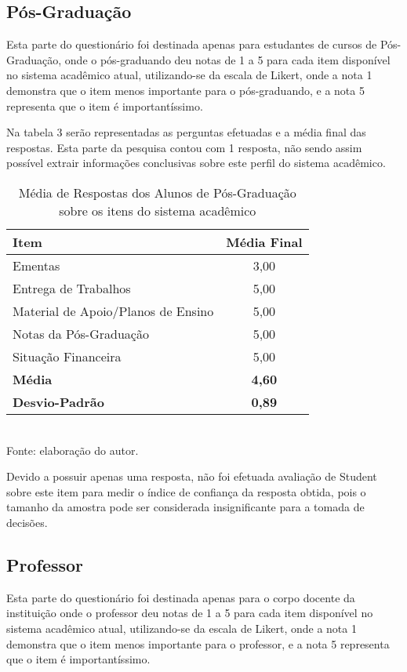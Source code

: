 \subsection{Pós-Graduação}
Esta parte do questionário foi destinada apenas para estudantes de cursos de Pós-Graduação, onde o pós-graduando deu notas de 1 a 5 para cada item disponível no sistema acadêmico atual, utilizando-se da escala de Likert, onde  a nota 1 demonstra que o item menos importante para o pós-graduando, e a nota 5 representa que o item é importantíssimo.

Na tabela 3 serão representadas as perguntas efetuadas e a média final das respostas. Esta parte da pesquisa contou com 1 resposta, não sendo assim possível extrair informações conclusivas sobre este perfil do sistema acadêmico.

\begin{table}[!hbt]
\centering
\caption[Média de Respostas dos Alunos de Pós-Graduação]{Média de Respostas dos Alunos de Pós-Graduação sobre os itens do sistema acadêmico}
\vspace{3mm}
\begin{tabular}{p{9.5cm}|c}\hline
\textbf{Item} & \textbf{Média Final} \\ \hline
Ementas & 3,00 \\ \hline
Entrega de Trabalhos & 5,00 \\ \hline
Material de Apoio/Planos de Ensino & 5,00 \\ \hline
Notas da Pós-Graduação & 5,00 \\ \hline
Situação Financeira & 5,00 \\ \hline
\textbf{Média} & \textbf{4,60} \\ \hline
\textbf{Desvio-Padrão} & \textbf{0,89} \\ \hline
\end{tabular}
\\ Fonte: elaboração do autor.
\end{table}

Devido a possuir apenas uma resposta, não foi efetuada avaliação de Student sobre este item para medir o índice de confiança da resposta obtida, pois o tamanho da amostra pode ser considerada insignificante para a tomada de decisões.

\subsection{Professor}
Esta parte do questionário foi destinada apenas para o corpo docente da instituição onde o professor deu notas de 1 a 5 para cada item disponível no sistema acadêmico atual, utilizando-se da escala de Likert, onde  a nota 1 demonstra que o item menos importante para o professor, e a nota 5 representa que o item é importantíssimo.


